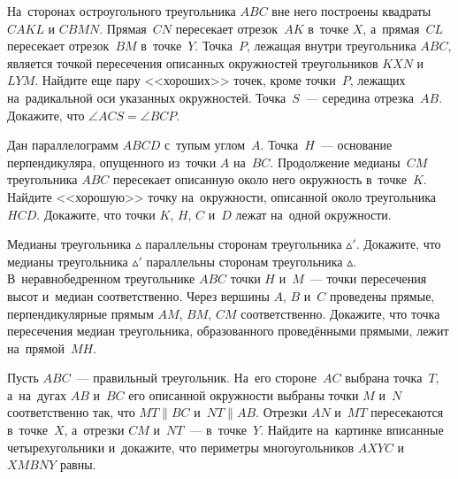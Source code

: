 


\begin{problems}
    \ifdefined\vartriangle
        \def\triangle{\mathord{\vartriangle}}
    \fi

\item
На~сторонах остроугольного треугольника $ABC$ вне него построены квадраты
$CAKL$ и $CBMN$.
Прямая~$CN$ пересекает отрезок~$AK$ в~точке $X$, а~прямая~$CL$ пересекает
отрезок~$BM$ в~точке~$Y$.
Точка~$P$, лежащая внутри треугольника $ABC$, является точкой пересечения
описанных окружностей треугольников $KXN$ и~$LYM$.
Найдите еще пару <<хороших>> точек, кроме точки~$P$, лежащих на~радикальной оси
указанных окружностей.
Точка~$S$~--- середина отрезка~$AB$.
Докажите, что $\angle ACS = \angle BCP$.

\item
Дан параллелограмм $ABCD$ с~тупым углом~$A$.
Точка~$H$~--- основание перпендикуляра, опущенного из~точки $A$ на~$BC$.
Продолжение медианы~$CM$ треугольника $ABC$ пересекает описанную около него
окружность в~точке~$K$.
Найдите <<хорошую>> точку на~окружности, описанной около треугольника $HCD$.
Докажите, что точки $K$, $H$, $C$ и~$D$ лежат на~одной окружности.

\item
\subproblem
Медианы треугольника $\triangle$ параллельны сторонам
треугольника $\triangle'$.
Докажите, что медианы треугольника $\triangle'$ параллельны сторонам
треугольника $\triangle$.
\\
\subproblem
В~неравнобедренном треугольнике $ABC$ точки $H$ и~$M$~--- точки пересечения
высот и~медиан соответственно.
Через вершины $A$, $B$ и~$C$ проведены прямые, перпендикулярные
прямым $AM$, $BM$, $CM$ соответственно.
Докажите, что точка пересечения медиан треугольника, образованного проведёнными
прямыми, лежит на~прямой~$MH$.

\item
Пусть $ABC$~--- правильный треугольник.
На~его стороне~$AC$ выбрана точка~$T$, а~на~дугах $AB$ и~$BC$ его описанной
окружности выбраны точки $M$ и~$N$ соответственно так, что $MT \parallel BC$
и~$NT \parallel AB$.
Отрезки $AN$ и~$MT$ пересекаются в~точке~$X$, а~отрезки $CM$ и~$NT$~---
в~точке~$Y$.
Найдите на~картинке вписанные четырехугольники и~докажите, что периметры
многоугольников $AXYC$ и~$XMBNY$ равны.


\end{problems}
